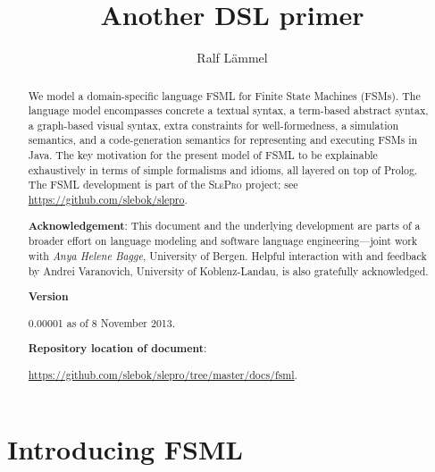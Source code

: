 \documentclass[preprint,authoryear,12pt]{noelsarticle}
\newcommand{\slepro}{\textsc{SlePro}}
\begin{document}
\begin{frontmatter}

\title{Another DSL primer}

\author{Ralf L\"ammel}

\address{Software Languages Team\\University of Koblenz-Landau, Germany}

\begin{abstract}
  We model a domain-specific language FSML for Finite State Machines
  (FSMs). The language model encompasses concrete a textual syntax, a
  term-based abstract syntax, a graph-based visual syntax, extra
  constraints for well-formedness, a simulation semantics, and a
  code-generation semantics for representing and executing FSMs in
  Java. The key motivation for the present model of FSML to be
  explainable exhaustively in terms of simple formalisms and idioms,
  all layered on top of Prolog. The FSML development is part of the
  \slepro{} project; see \url{https://github.com/slebok/slepro}.

\bigskip

\noindent
\textbf{Acknowledgement}: {\small This document and the underlying
  development are parts of a broader effort on language modeling and
  software language engineering---joint work with \emph{Anya Helene
    Bagge}, University of Bergen. Helpful interaction with and
  feedback by Andrei Varanovich, University of Koblenz-Landau, is also
  gratefully acknowledged.}

\medskip

\noindent
\textbf{Version}

0.00001 as of 8 November 2013.

\medskip

\noindent
\textbf{Repository location of document}: 

\url{https://github.com/slebok/slepro/tree/master/docs/fsml}.
\end{abstract}

\end{frontmatter}

\pagebreak


\tableofcontents

\pagebreak


\section{Introducing FSML}
\end{document}
